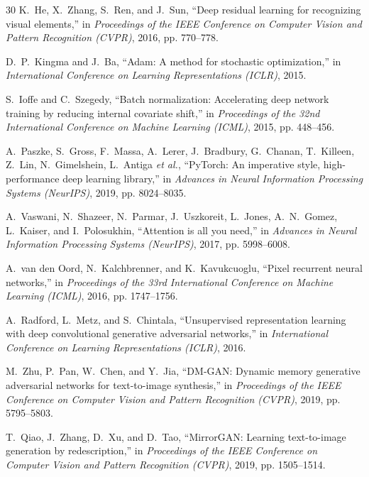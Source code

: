 \documentclass[conference]{IEEEtran}
\begin{document}
\begin{thebibliography}{30}
K.~He, X.~Zhang, S.~Ren, and J.~Sun, ``Deep residual learning for recognizing visual elements,'' in \textit{Proceedings of the IEEE Conference on Computer Vision and Pattern Recognition (CVPR)}, 2016, pp. 770--778.

D.~P.~Kingma and J.~Ba, ``Adam: A method for stochastic optimization,'' in \textit{International Conference on Learning Representations (ICLR)}, 2015.

S.~Ioffe and C.~Szegedy, ``Batch normalization: Accelerating deep network training by reducing internal covariate shift,'' in \textit{Proceedings of the 32nd International Conference on Machine Learning (ICML)}, 2015, pp. 448--456.

A.~Paszke, S.~Gross, F.~Massa, A.~Lerer, J.~Bradbury, G.~Chanan, T.~Killeen, Z.~Lin, N.~Gimelshein, L.~Antiga \textit{et al.}, ``PyTorch: An imperative style, high-performance deep learning library,'' in \textit{Advances in Neural Information Processing Systems (NeurIPS)}, 2019, pp. 8024--8035.

A.~Vaswani, N.~Shazeer, N.~Parmar, J.~Uszkoreit, L.~Jones, A.~N.~Gomez, L.~Kaiser, and I.~Polosukhin, ``Attention is all you need,'' in \textit{Advances in Neural Information Processing Systems (NeurIPS)}, 2017, pp. 5998--6008.

A.~van den Oord, N.~Kalchbrenner, and K.~Kavukcuoglu, ``Pixel recurrent neural networks,'' in \textit{Proceedings of the 33rd International Conference on Machine Learning (ICML)}, 2016, pp. 1747--1756.

A.~Radford, L.~Metz, and S.~Chintala, ``Unsupervised representation learning with deep convolutional generative adversarial networks,'' in \textit{International Conference on Learning Representations (ICLR)}, 2016.

M.~Zhu, P.~Pan, W.~Chen, and Y.~Jia, ``DM-GAN: Dynamic memory generative adversarial networks for text-to-image synthesis,'' in \textit{Proceedings of the IEEE Conference on Computer Vision and Pattern Recognition (CVPR)}, 2019, pp. 5795--5803.

T.~Qiao, J.~Zhang, D.~Xu, and D.~Tao, ``MirrorGAN: Learning text-to-image generation by redescription,'' in \textit{Proceedings of the IEEE Conference on Computer Vision and Pattern Recognition (CVPR)}, 2019, pp. 1505--1514.


\end{thebibliography}
\end{document}

